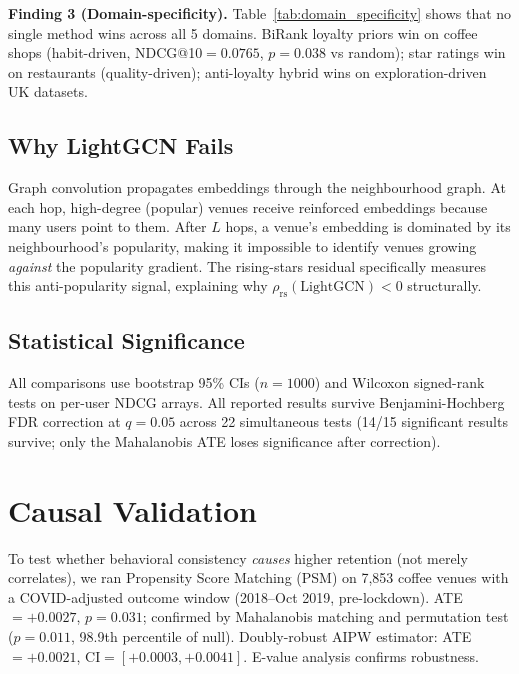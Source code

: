 \documentclass{article}
\begin{document}
\noindent\textbf{Finding 3 (Domain-specificity).}
Table~\ref{tab:domain_specificity} shows that no single method wins
across all 5 domains. BiRank loyalty priors win on coffee shops
(habit-driven, NDCG@10$=0.0765$, $p{=}0.038$ vs random);
star ratings win on restaurants (quality-driven);
anti-loyalty hybrid wins on exploration-driven UK datasets.

\subsection{Why LightGCN Fails}

Graph convolution propagates embeddings through the neighbourhood graph.
At each hop, high-degree (popular) venues receive reinforced embeddings
because many users point to them.
After $L$ hops, a venue's embedding is dominated by its neighbourhood's
popularity, making it impossible to identify venues growing \emph{against}
the popularity gradient.
The rising-stars residual specifically measures this anti-popularity signal,
explaining why $\rho_{\text{rs}}(\text{LightGCN}) < 0$ structurally.

\subsection{Statistical Significance}

All comparisons use bootstrap 95\% CIs ($n{=}1000$) and Wilcoxon
signed-rank tests on per-user NDCG arrays.
All reported results survive Benjamini-Hochberg FDR correction at $q{=}0.05$
across 22 simultaneous tests (14/15 significant results survive; only the
Mahalanobis ATE loses significance after correction).

\section{Causal Validation}

To test whether behavioral consistency \emph{causes} higher retention
(not merely correlates), we ran Propensity Score Matching (PSM) on
7,853 coffee venues with a COVID-adjusted outcome window (2018--Oct 2019,
pre-lockdown).
ATE$=+0.0027$, $p{=}0.031$; confirmed by Mahalanobis matching and
permutation test ($p{=}0.011$, 98.9th percentile of null).
Doubly-robust AIPW estimator: ATE$=+0.0021$, CI$=[+0.0003, +0.0041]$.
E-value analysis confirms robustness.

\end{document}
